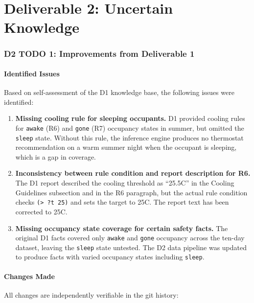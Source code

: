 \documentclass{article}
\begin{document}
\part*{Deliverable 2: Uncertain Knowledge}

\section{D2 TODO 1: Improvements from Deliverable 1}

\subsection{Identified Issues}

Based on self-assessment of the D1 knowledge base, the following issues were identified:

\begin{enumerate}
    \item \textbf{Missing cooling rule for sleeping occupants.}
    D1 provided cooling rules for \texttt{awake} (R6) and \texttt{gone} (R7) occupancy states in summer, but omitted the \texttt{sleep} state. Without this rule, the inference engine produces no thermostat recommendation on a warm summer night when the occupant is sleeping, which is a gap in coverage.

    \item \textbf{Inconsistency between rule condition and report description for R6.}
    The D1 report described the cooling threshold as ``25.5\textdegree C'' in the Cooling Guidelines subsection and in the R6 paragraph, but the actual rule condition checks \texttt{(> ?t 25)} and sets the target to 25\textdegree C. The report text has been corrected to 25\textdegree C.

    \item \textbf{Missing occupancy state coverage for certain safety facts.}
    The original D1 facts covered only \texttt{awake} and \texttt{gone} occupancy across the ten-day dataset, leaving the \texttt{sleep} state untested. The D2 data pipeline was updated to produce facts with varied occupancy states including \texttt{sleep}.
\end{enumerate}

\subsection{Changes Made}

All changes are independently verifiable in the git history:
\end{document}
